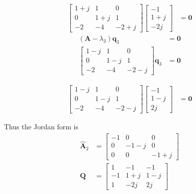 \begin{itemize}
\begin{align*}
  \begin{bmatrix}
     1+j & 1 & 0 \\
     0 & 1+j & 1 \\
    -2 & -4 & -2+j
    \end{bmatrix}
    \begin{bmatrix}
     -1 \\ 1+j \\ -2j
    \end{bmatrix}
    &= \mathbf{0}
\end{align*}
\begin{align*}
 (\mathbf{A}-\lambda_3) \mathbf{q}_3 &= \mathbf{0}\\
 \begin{bmatrix}
     1-j & 1 & 0 \\
     0 & 1-j & 1 \\
    -2 & -4 & -2-j
    \end{bmatrix}\mathbf{q}_3 &= \mathbf{0}
\end{align*}

\begin{align*}
  \begin{bmatrix}
     1-j & 1 & 0 \\
     0 & 1-j & 1 \\
    -2 & -4 & -2-j
    \end{bmatrix}
    \begin{bmatrix}
     -1 \\ 1-j \\ 2j
    \end{bmatrix}
    &= \mathbf{0}
\end{align*}

Thus the Jordan form is
 \begin{align*}
 \hat{\mathbf{A}}_2 &= \begin{bmatrix}
                        -1 & 0 &0\\0 & -1-j & 0\\0 & 0&-1+j
                       \end{bmatrix}\\
  \mathbf{Q} &= \begin{bmatrix}
   1 & -1 & -1\\
   -1 & 1+j & 1-j\\
   1 & -2j &2j
  \end{bmatrix}
 \end{align*}



\end{itemize}
